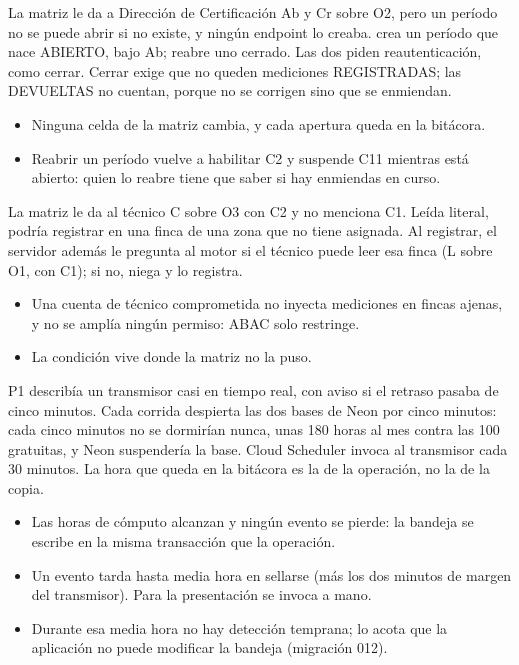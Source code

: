 \documentclass[11pt,a4paper]{article}
\theoremstyle{definition}
\theoremstyle{remark}
\begin{document}
\adrctx La matriz le da a Dirección de Certificación Ab y Cr sobre O2, pero un
período no se puede abrir si no existe, y ningún endpoint lo creaba.
\adrdec {} crea un período que nace ABIERTO, bajo Ab;
 reabre uno cerrado. Las dos piden
reautenticación, como cerrar. Cerrar exige que no queden mediciones
REGISTRADAS; las DEVUELTAS no cuentan, porque no se corrigen sino que se
enmiendan.
\adrpos
\begin{itemize}
  \item Ninguna celda de la matriz cambia, y cada apertura queda en la
    bitácora.
\end{itemize}
\adrneg
\begin{itemize}
  \item Reabrir un período vuelve a habilitar C2 y suspende C11 mientras está
    abierto: quien lo reabre tiene que saber si hay enmiendas en curso.
\end{itemize}

\adrctx La matriz le da al técnico C sobre O3 con C2 y no menciona C1. Leída
literal, podría registrar en una finca de una zona que no tiene asignada.
\adrdec Al registrar, el servidor además le pregunta al motor si el técnico
puede leer esa finca (L sobre O1, con C1); si no, niega y lo registra.
\adrpos
\begin{itemize}
  \item Una cuenta de técnico comprometida no inyecta mediciones en fincas
    ajenas, y no se amplía ningún permiso: ABAC solo restringe.
\end{itemize}
\adrneg
\begin{itemize}
  \item La condición vive donde la matriz no la puso.
\end{itemize}

\adrctx P1 describía un transmisor casi en tiempo real, con aviso si el retraso
pasaba de cinco minutos. Cada corrida despierta las dos bases de Neon por
cinco minutos: cada cinco minutos no se dormirían nunca, unas 180 horas al
mes contra las 100 gratuitas, y Neon suspendería la base.
\adrdec Cloud Scheduler invoca al transmisor cada 30 minutos. La hora que queda
en la bitácora es la de la operación, no la de la copia.
\adrpos
\begin{itemize}
  \item Las horas de cómputo alcanzan y ningún evento se pierde: la bandeja se
    escribe en la misma transacción que la operación.
\end{itemize}
\adrneg
\begin{itemize}
  \item Un evento tarda hasta media hora en sellarse (más los dos minutos de
    margen del transmisor). Para la presentación se invoca a mano.
  \item Durante esa media hora no hay detección temprana; lo acota que la
    aplicación no puede modificar la bandeja (migración 012).
\end{itemize}
\end{document}

